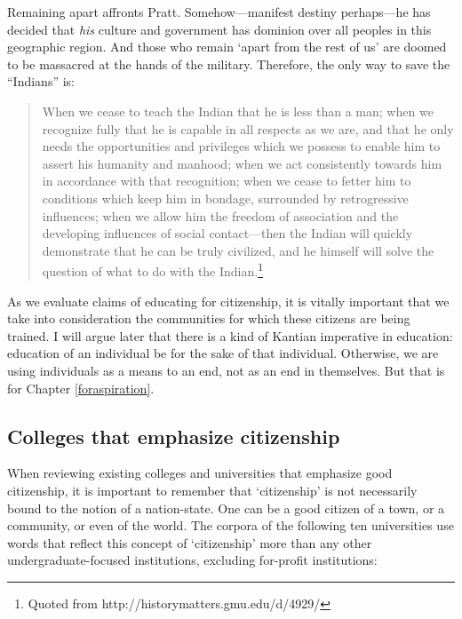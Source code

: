 Remaining apart affronts Pratt. Somehow---manifest destiny perhaps---he has decided that \emph{his} culture and government has dominion over all peoples in this geographic region. And those who remain `apart from the rest of us' are doomed to be massacred at the hands of the military. Therefore, the only way to save the ``Indians'' is:

\begin{quote}

When we cease to teach the Indian that he is less than a man; when we recognize fully that he is capable in all respects as we are, and that he only needs the opportunities and privileges which we possess to enable him to assert his humanity and manhood; when we act consistently towards him in accordance with that recognition; when we cease to fetter him to conditions which keep him in bondage, surrounded by retrogressive influences; when we allow him the freedom of association and the developing influences of social contact---then the Indian will quickly demonstrate that he can be truly civilized, and he himself will solve the question of what to do with the Indian.\footnote{Quoted from http:\slash \slash historymatters.gmu.edu\slash d\slash 4929\slash } 
\end{quote}

As we evaluate claims of educating for citizenship, it is vitally important that we take into consideration the communities for which these citizens are being trained. I will argue later that there is a kind of Kantian imperative in education: education of an individual be for the sake of that individual. Otherwise, we are using individuals as a means to an end, not as an end in themselves. But that is for Chapter \ref{foraspiration}.

\subsection{Colleges that emphasize citizenship}
\label{collegesthatemphasizecitizenship}

When reviewing existing colleges and universities that emphasize good citizenship, it is important to remember that `citizenship' is not necessarily bound to the notion of a nation-state. One can be a good citizen of a town, or a community, or even of the world. The corpora of the following ten universities use words that reflect this concept of `citizenship' more than any other undergraduate-focused institutions, excluding for-profit institutions: 

